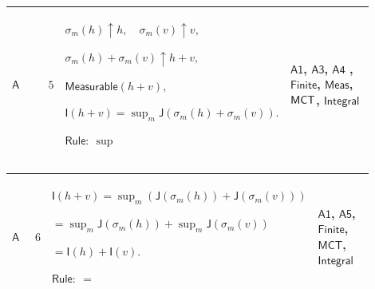 \documentclass[12pt,reqno]{amsart}
\theoremstyle{blueplain}
\numberwithin{equation}{section}
\begin{document}
{\scriptsize \setlength{\parskip}{0pt}\nointerlineskip
\noindent 
\begin{tabular}{|@{}>{\centering\arraybackslash}m{0.10658\linewidth}|>{\centering\arraybackslash}m{0.03553\linewidth}|>{\centering\arraybackslash}m{0.52105\linewidth}|>{\centering\arraybackslash}m{0.23684\linewidth}|}
\hline
\hypertarget{dct:A5}{$\displaystyle \mathsf{A}$} & $\displaystyle 5$ & $%
\displaystyle \sigma_m(h)\uparrow h,\quad\sigma_m(v)\uparrow v,$\par$%
\displaystyle \sigma_m(h)+\sigma_m(v)\uparrow h+v,$\par$\displaystyle 
\mathsf{Measurable}(h+v),$\par$\displaystyle \mathsf{I}(h+v)=\sup_m\mathsf{J}%
(\sigma_m(h)+\sigma_m(v)).$\par$\displaystyle \mathsf{Rule}:\ \sup$ & 
\hyperlink{dct:A1}{$\displaystyle \mathsf{A1}$}, \hyperlink{dct:A3}{$%
\displaystyle \mathsf{A3}$}, \hyperlink{dct:A4}{$\displaystyle \mathsf{A4}$}%
, \hyperlink{lem:Finite}{$\displaystyle \mathsf{Finite}$}, \hyperlink{lem:Meas}%
{$\displaystyle \mathsf{Meas}$}, \hyperlink{lem:MCT}{$\displaystyle \mathsf{%
MCT}$}, \hyperlink{lem:Integral}{$\displaystyle \mathsf{Integral}$} \\ \hline
\end{tabular}%
}

{\scriptsize \setlength{\parskip}{0pt}\nointerlineskip
\noindent 
\begin{tabular}{|@{}>{\centering\arraybackslash}m{0.10658\linewidth}|>{\centering\arraybackslash}m{0.03553\linewidth}|>{\centering\arraybackslash}m{0.52105\linewidth}|>{\centering\arraybackslash}m{0.23684\linewidth}|}
\hline
\hypertarget{dct:A6}{$\displaystyle \mathsf{A}$} & $\displaystyle 6$ & $%
\displaystyle \mathsf{I}(h+v)=\sup_m(\mathsf{J}(\sigma_m(h))+\mathsf{J}%
(\sigma_m(v)))$\par$\displaystyle {}=\sup_m\mathsf{J}(\sigma_m(h))+\sup_m%
\mathsf{J}(\sigma_m(v))$\par$\displaystyle {}=\mathsf{I}(h)+\mathsf{I}(v).$%
\par$\displaystyle \mathsf{Rule}:\ =$ & \hyperlink{dct:A1}{$\displaystyle 
\mathsf{A1}$}, \hyperlink{dct:A5}{$\displaystyle \mathsf{A5}$}, \hyperlink{lem:Finite}%
{$\displaystyle \mathsf{Finite}$}, \hyperlink{lem:MCT}{$\displaystyle 
\mathsf{MCT}$}, \hyperlink{lem:Integral}{$\displaystyle \mathsf{Integral}$}
\\ \hline
\end{tabular}%
}
\end{document}
